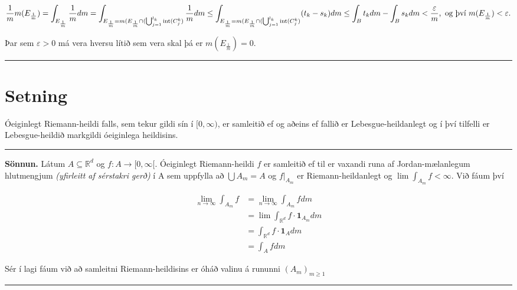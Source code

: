 \documentclass[]{book}
\begin{document}
\[
\frac1m m(E_{\frac1m}) = \int_{E_{\frac1m}}\frac1mdm = \int_{E_{\frac1m} = m(E_{\frac1m}\cap(\bigcup_{j=1}^{l_k}\text{int}(C_j^k)}\frac1mdm \leq \int_{E_{\frac1m} = m(E_{\frac1m}\cap(\bigcup_{j=1}^{l_k}\text{int}(C_j^k)}(t_k - s_k)dm \leq \int_B t_kdm - \int_B s_kdm < \frac\varepsilon m, \text{ og því } \\
m(E_{\frac1m}) < \varepsilon.
\]

Þar sem \(\varepsilon > 0\) má vera hversu lítið sem vera skal þá er \(m(E_{\frac1m}) = 0\).

\begin{center}\rule{0.5\linewidth}{\linethickness}\end{center}

\hypertarget{setning-55}{%
\section{Setning}\label{setning-55}}

Óeiginlegt Riemann-heildi falls, sem tekur gildi sín í \([0,\infty)\), er samleitið ef og aðeins ef fallið er Lebesgue-heildanlegt og í því tilfelli er Lebesgue-heildið markgildi óeiginlega heildisins.

\begin{center}\rule{0.5\linewidth}{\linethickness}\end{center}

\textbf{Sönnun.} Látum \(A\subseteq\mathbb R^d\) og \(f:A\rightarrow[0,\infty[\). Óeiginlegt Riemann-heildi \(f\) er samleitið ef til er vaxandi runa af Jordan-mælanlegum hlutmengjum \emph{(yfirleitt af sérstakri gerð)} í A sem uppfylla að \(\bigcup A_m = A\) og \(f|_{A_m}\) er Riemann-heildanlegt og \(\lim \int_{A_m}f < \infty\). Við fáum því

\[
\begin{aligned}
\lim_{n\rightarrow\infty}\int_{A_m}f &= \lim_{n\rightarrow\infty}\int_{A_m}fdm \\
&= \lim\int_{\mathbb R^d}f\cdot\mathbf1_{A_m}dm \\
&=  \int_{\mathbb R^d}f\cdot\mathbf1_Adm \\
&= \int_Afdm
\end{aligned}
\]

Sér í lagi fáum við að samleitni Riemann-heildisins er óháð valinu á rununni \((A_m)_{m\geq1}\)

\begin{center}\rule{0.5\linewidth}{\linethickness}\end{center}
\end{document}
